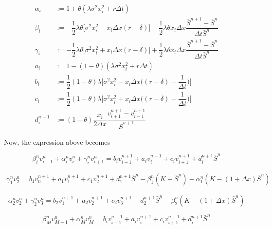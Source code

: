\begin{align}
    \alpha_i &:= 1 + \theta (\lambda \sigma^2 x_{i}^{2} + r{\Delta t}) \\
    \beta_i &:= - \dfrac{1}{2} \lambda \theta \bigg[ \sigma^{2} x_{i}^{2} - x_i \Delta x (r - \delta) \bigg]  - \dfrac{1}{2} \lambda \theta   x_i \Delta x \dfrac{\bar{S}^{n+1} - \bar{S}^{n}}{\Delta t \bar{S}^n}  \\
    \gamma_i &:= -\dfrac{1}{2} \lambda \theta \bigg[ \sigma^{2} x_{i}^{2} + x_i \Delta x (r - \delta) \bigg]  + \dfrac{1}{2} \lambda \theta  x_i \Delta x  \dfrac{\bar{S}^{n+1} - \bar{S}^{n}}{\Delta t \bar{S}^n}\\
    a_i &:= 1 - (1-\theta) (\lambda \sigma^2 x_{i}^{2} +  r{\Delta t}) \\
    b_i &:= \dfrac{1}{2} (1-\theta) \lambda \bigg[\sigma^{2} x_{i}^{2} - x_i \Delta x \bigg( (r - \delta) - \dfrac{1}{\Delta t} \bigg) \bigg] \\
    c_i &:= \dfrac{1}{2} (1-\theta) \lambda \bigg[ \sigma^{2} x_{i}^{2} +  x_i \Delta x \bigg( (r - \delta) - \dfrac{1}{\Delta t} \bigg) \bigg] \\
    d^{n+1}_i &:= (1-\theta) \dfrac{x_i}{2 \Delta x}  \dfrac{v^{n+1}_{i+1} - v^{n+1}_{i-1}}{\bar{S}^{n+1}}
\end{align}

Now, the expression above becomes

\begin{equation}
    \beta^{n}_{i} v^{n}_{i-1} + \alpha^{n}_{i} v^{n}_{i} + \gamma^{n}_{i} v^{n}_{i+1} = b_i v^{n+1}_{i-1} + a_i v^{n+1}_{i} + c_i v^{n+1}_{i+1} + d^{n+1}_{i}\bar{S}^{n}
\end{equation}

\begin{align}
    \gamma^{n}_{1} v^{n}_{2} = b_1 v^{n+1}_{0} + a_1 v^{n+1}_{1} + c_1 v^{n+1}_{2} + d^{n+1}_{1}\bar{S}^{n} - \beta^{n}_{1} (K - \bar{S}^n) - \alpha^{n}_{1} (K - (1+\Delta x)\bar{S}^n) 
\end{align}

\begin{equation}
    \alpha^{n}_{2} v^{n}_{2} + \gamma^{n}_{2} v^{n}_{3} = b_2 v^{n+1}_{1} + a_2 v^{n+1}_{2} + c_2 v^{n+1}_{3} + d^{n+1}_{2}\bar{S}^{n} - \beta^{n}_{2} (K - (1+\Delta x)\bar{S}^n) 
\end{equation}

\begin{equation}
    \beta^{n}_{M} v^{n}_{M-1} + \alpha^{n}_{M} v^{n}_{M} = b_i v^{n+1}_{i-1} + a_i v^{n+1}_{i} + c_i v^{n+1}_{i+1} + d^{n+1}_{i}\bar{S}^{n}
\end{equation}
